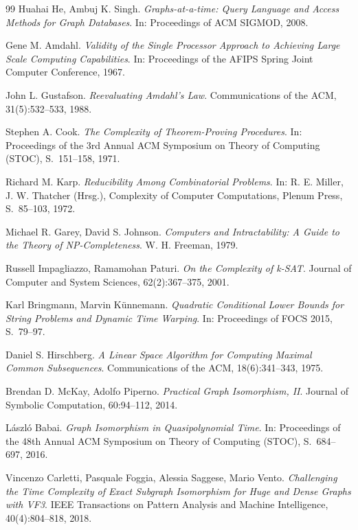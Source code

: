\documentclass[a4paper,12pt, twoside]{report}
\theoremstyle{definition}
\begin{document}
\begin{thebibliography}{99}
Huahai He, Ambuj K. Singh.
\emph{Graphs-at-a-time: Query Language and Access Methods for Graph Databases}.
In: Proceedings of ACM SIGMOD, 2008.

Gene M. Amdahl.
\emph{Validity of the Single Processor Approach to Achieving Large Scale Computing Capabilities}.
In: Proceedings of the AFIPS Spring Joint Computer Conference, 1967.

John L. Gustafson.
\emph{Reevaluating Amdahl's Law}.
Communications of the ACM, 31(5):532--533, 1988.

Stephen A. Cook.
\emph{The Complexity of Theorem-Proving Procedures}.
In: Proceedings of the 3rd Annual ACM Symposium on Theory of Computing (STOC), S.~151--158, 1971.

Richard M. Karp.
\emph{Reducibility Among Combinatorial Problems}.
In: R. E. Miller, J. W. Thatcher (Hrsg.), Complexity of Computer Computations, Plenum Press, S.~85--103, 1972.

Michael R. Garey, David S. Johnson.
\emph{Computers and Intractability: A Guide to the Theory of NP-Completeness}.
W. H. Freeman, 1979.

Russell Impagliazzo, Ramamohan Paturi.
\emph{On the Complexity of k-SAT}.
Journal of Computer and System Sciences, 62(2):367--375, 2001.

Karl Bringmann, Marvin Künnemann.
\emph{Quadratic Conditional Lower Bounds for String Problems and Dynamic Time Warping}.
In: Proceedings of FOCS 2015, S.~79--97.

Daniel S. Hirschberg.
\emph{A Linear Space Algorithm for Computing Maximal Common Subsequences}.
Communications of the ACM, 18(6):341--343, 1975.

Brendan D. McKay, Adolfo Piperno.
\emph{Practical Graph Isomorphism, II}.
Journal of Symbolic Computation, 60:94--112, 2014.

László Babai.
\emph{Graph Isomorphism in Quasipolynomial Time}.
In: Proceedings of the 48th Annual ACM Symposium on Theory of Computing (STOC), S.~684--697, 2016.

Vincenzo Carletti, Pasquale Foggia, Alessia Saggese, Mario Vento.
\emph{Challenging the Time Complexity of Exact Subgraph Isomorphism for Huge and Dense Graphs with VF3}.
IEEE Transactions on Pattern Analysis and Machine Intelligence, 40(4):804--818, 2018.


\end{thebibliography}
\end{document}
